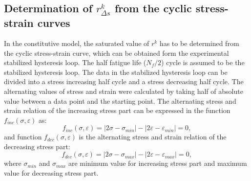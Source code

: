 \subsection{Determination of $r_{\Delta s}^k$ from the cyclic stress-strain curves}
In the constitutive model, the saturated value of $r^k$ has to be determined from the cyclic stress-strain curve, which can be obtained form the experimental stabilized hysteresis loop.
The half fatigue life ($N_f/2$) cycle is assumed to be the stabilized hysteresis loop.
The data in the stabilized hysteresis loop can be divided into a stress increasing half cycle and a stress decreasing half cycle.
The alternating values of stress and strain were calculated by taking half of absolute value between a data point and the starting point.
The alternating stress and strain relation of the increasing stress part can be expressed in the function $f_{inc}(\sigma,\varepsilon)$ as:
\begin{equation}
f_{inc}(\sigma,\varepsilon)=|2\sigma-\sigma_{min}|-|2\varepsilon-\varepsilon_{min}|=0,
\end{equation}
and function $f_{dec}(\sigma,\varepsilon)$ is the alternating stress and strain relation of the decreasing stress part:
\begin{equation}
f_{dec}(\sigma,\varepsilon)=|2\sigma-\sigma_{max}|-|2\varepsilon-\varepsilon_{max}|=0,
\end{equation}
where $\sigma_{min}$ and $\sigma_{max}$ are minimum value for increasing stress part and maximum value for decreasing stress part.

